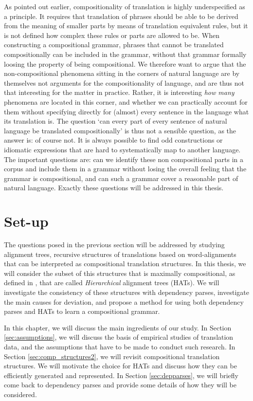 \documentclass[hidelinks]{report}
\begin{document}
As pointed out earlier, compositionality  of translation is highly underspecified as a principle. It requires that translation of phrases should be able to be derived from the meaning of smaller parts by means of translation equivalent rules, but it is not defined how complex these rules or parts are allowed to be. When constructing a compositional grammar, phrases that cannot be translated compositionally can be included in the grammar, without that grammar formally loosing the property of being compositional. We therefore want to argue that the non-compositional phenomena sitting in the corners of natural language are by themselves not arguments for the compositionality of language, and are thus not that interesting for the matter in practice. Rather, it is interesting \textit{how many} phenomena are located in this corner, and whether we can practically account for them without specifying directly for (almost) every sentence in the language what its translation is. The question `can every part of every sentence of natural language be translated compositionally' is thus not a sensible question, as the answer is: of course not. It is always possible to find odd constructions or idiomatic expressions that are hard to systematically map to another language. The important questions are: can we identify these non compositional parts in a corpus and include them in a grammar without losing the overall feeling that the grammar is compositional, and can such a grammar cover a reasonable part of natural language. Exactly these questions will be addressed in this thesis.

\section{Set-up}
\label{sec:setup}

The questions posed in the previous section will be addressed by studying alignment trees, recursive structures of translations based on word-alignments that can be interpreted as compositional translation structures. In this thesis, we will consider the subset of this structures that is maximally compositional, as defined in \cite{simaan2013hats}, that are called \textit{Hierarchical} alignment trees (HATs). We will investigate the consistency of these structures with dependency parses, investigate the main causes for deviation, and propose a method for using both dependency parses and HATs to learn a compositional grammar.

In this chapter, we will discuss the main ingredients of our study. In Section \ref{sec:assumptions}, we will discuss the basis of empirical studies of translation data, and the assumptions that have to be made to conduct such research. In Section \ref{sec:comp_structures2}, we will revisit compositional translation structures. We will motivate the choice for HATs and discuss how they can be efficiently generated and represented. In Section \ref{sec:depparses}, we will briefly come back to dependency parses and provide some details of how they will be considered.
\end{document}
